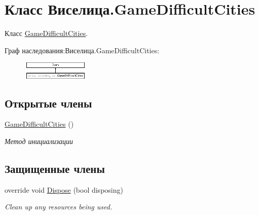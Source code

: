 \hypertarget{class_xD0_x92_xD0_xB8_xD1_x81_xD0_xB5_xD0_xBB_xD0_xB8_xD1_x86_xD0_xB0_1_1_game_difficult_cities}{\section{Класс Виселица.\+Game\+Difficult\+Cities}
\label{class_xD0_x92_xD0_xB8_xD1_x81_xD0_xB5_xD0_xBB_xD0_xB8_xD1_x86_xD0_xB0_1_1_game_difficult_cities}
}


Класс \hyperlink{class_xD0_x92_xD0_xB8_xD1_x81_xD0_xB5_xD0_xBB_xD0_xB8_xD1_x86_xD0_xB0_1_1_game_difficult_cities}{Game\+Difficult\+Cities}.  


Граф наследования\+:Виселица.\+Game\+Difficult\+Cities\+:\begin{figure}[H]
\begin{center}
\leavevmode
\includegraphics[height=0.829015cm]{class_xD0_x92_xD0_xB8_xD1_x81_xD0_xB5_xD0_xBB_xD0_xB8_xD1_x86_xD0_xB0_1_1_game_difficult_cities}
\end{center}
\end{figure}
\subsection*{Открытые члены}
\begin{DoxyCompactItemize}
\item 
\hyperlink{class_xD0_x92_xD0_xB8_xD1_x81_xD0_xB5_xD0_xBB_xD0_xB8_xD1_x86_xD0_xB0_1_1_game_difficult_cities_ac44fc6d861eac3a3c990fcf2fd0de7e2}{Game\+Difficult\+Cities} ()
\begin{DoxyCompactList}\small\item\em Метод инициализации \end{DoxyCompactList}\end{DoxyCompactItemize}
\subsection*{Защищенные члены}
\begin{DoxyCompactItemize}
\item 
override void \hyperlink{class_xD0_x92_xD0_xB8_xD1_x81_xD0_xB5_xD0_xBB_xD0_xB8_xD1_x86_xD0_xB0_1_1_game_difficult_cities_a45567bf0f1366f555d84b7b21baf91c6}{Dispose} (bool disposing)
\begin{DoxyCompactList}\small\item\em Clean up any resources being used. \end{DoxyCompactList}\end{DoxyCompactItemize}


